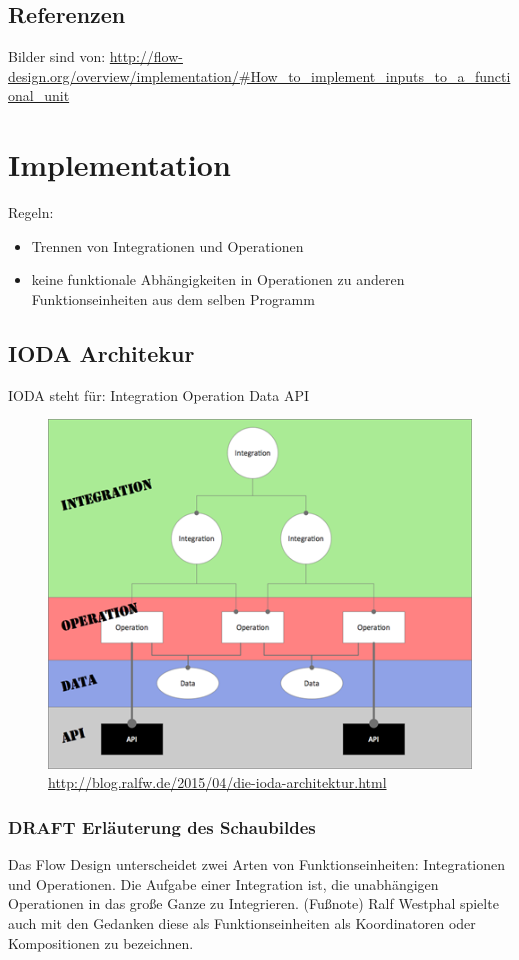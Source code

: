 \documentclass[11pt]{article}
\begin{document}
\subsection{Referenzen}
\label{sec:orgheadline32}
Bilder sind von: 
\url{http://flow-design.org/overview/implementation/#How_to_implement_inputs_to_a_functional_unit}

\section{Implementation}
\label{sec:orgheadline74}

Regeln:
\begin{itemize}
\item Trennen von Integrationen und Operationen
\item keine funktionale Abhängigkeiten in Operationen zu anderen Funktionseinheiten aus dem selben Programm
\end{itemize}
\subsection{IODA Architekur}
\label{sec:orgheadline40}
IODA steht für: Integration Operation Data API
\begin{figure}[htb]
\centering
\includegraphics[width=.9\linewidth]{./img/ioda1.png}
\caption{\url{http://blog.ralfw.de/2015/04/die-ioda-architektur.html}}
\end{figure}

\subsubsection{{\bfseries\sffamily DRAFT} Erläuterung des Schaubildes}
\label{sec:orgheadline34}
Das Flow Design unterscheidet zwei Arten von Funktionseinheiten: Integrationen und Operationen.
Die Aufgabe einer Integration ist, die unabhängigen Operationen in das große Ganze zu
Integrieren. 
(Fußnote) Ralf Westphal spielte auch mit den Gedanken diese als Funktionseinheiten als Koordinatoren oder
Kompositionen zu bezeichnen.
\end{document}
